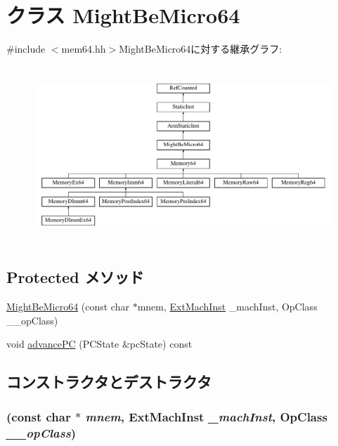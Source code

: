 \hypertarget{classArmISA_1_1MightBeMicro64}{
\section{クラス MightBeMicro64}
\label{classArmISA_1_1MightBeMicro64}
}


{\ttfamily \#include $<$mem64.hh$>$}MightBeMicro64に対する継承グラフ:\begin{figure}[H]
\begin{center}
\leavevmode
\includegraphics[height=6.68657cm]{classArmISA_1_1MightBeMicro64}
\end{center}
\end{figure}
\subsection*{Protected メソッド}
\begin{DoxyCompactItemize}
\item 
\hyperlink{classArmISA_1_1MightBeMicro64_a41600c15aedcbbabd562d36e0d5a804c}{MightBeMicro64} (const char $\ast$mnem, \hyperlink{classStaticInst_a5605d4fc727eae9e595325c90c0ec108}{ExtMachInst} \_\-machInst, OpClass \_\-\_\-opClass)
\item 
void \hyperlink{classArmISA_1_1MightBeMicro64_af04cd01429462d48e635f3e01ced6257}{advancePC} (PCState \&pcState) const 
\end{DoxyCompactItemize}


\subsection{コンストラクタとデストラクタ}
\hypertarget{classArmISA_1_1MightBeMicro64_a41600c15aedcbbabd562d36e0d5a804c}{
\subsubsection[{MightBeMicro64}]{ (const char $\ast$ {\em mnem}, \/  {\bf ExtMachInst} {\em \_\-machInst}, \/  OpClass {\em \_\-\_\-opClass})}}
\label{classArmISA_1_1MightBeMicro64_a41600c15aedcbbabd562d36e0d5a804c}



